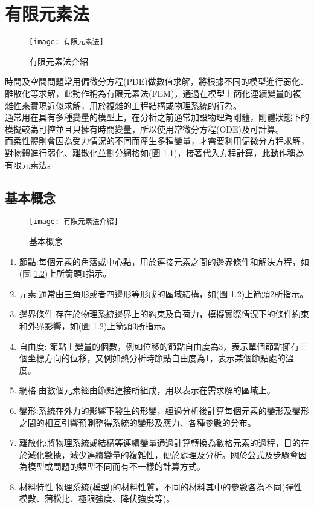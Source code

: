 \chapter{有限元素法}

\begin{figure}[hbt!]
\begin{center}
\texttt{[image: 有限元素法]}
\caption{\Large 有限元素法介紹}\label{有限元素法}
\end{center}
\end{figure}
時間及空間問題常用偏微分方程(PDE)做數值求解，將根據不同的模型進行弱化、離散化等求解，此動作稱為有限元素法(FEM)，通過在模型上簡化連續變量的複雜性來實現近似求解，用於複雜的工程結構或物理系統的行為。\\
通常用在具有多種變量的模型上，在分析之前通常加設物理為剛體，剛體狀態下的模擬較為可控並且只擁有時間變量，所以使用常微分方程(ODE)及可計算。\\
而柔性體則會因為受力情況的不同而產生多種變量，才需要利用偏微分方程求解，對物體進行弱化、離散化並劃分網格如(圖 \ref{有限元素法})，接著代入方程計算，此動作稱為有限元素法。\\
\newpage
\section{基本概念}

\begin{figure}[hbt!]
\begin{center}
\texttt{[image: 有限元素法介紹]}
\caption{\Large 基本概念}\label{有限元素法介紹}
\end{center}
\end{figure}

\begin{enumerate}
\item 節點:每個元素的角落或中心點，用於連接元素之間的邊界條件和解決方程，如(圖 \ref{有限元素法介紹})上所箭頭1指示。
\item 元素:通常由三角形或者四邊形等形成的區域結構，如(圖 \ref{有限元素法介紹})上箭頭2所指示。
\item 邊界條件:存在於物理系統邊界上的約束及負荷力，模擬實際情況下的條件約束和外界影響，如(圖 \ref{有限元素法介紹})上箭頭3所指示。
\item 自由度: 節點上變量的個數，例如位移的節點自由度為3，表示單個節點擁有三個坐標方向的位移，又例如熱分析時節點自由度為1，表示某個節點處的溫度。
\item 網格:由數個元素經由節點連接所組成，用以表示在需求解的區域上。
\item 變形:系統在外力的影響下發生的形變，經過分析後計算每個元素的變形及變形之間的相互引響預測整得系統的變形及應力、各種參數的分布。
\item 離散化:將物理系統或結構等連續變量通過計算轉換為數格元素的過程，目的在於減化數據，減少連續變量的複雜性，便於處理及分析。關於公式及步驟會因為模型或問題的類型不同而有不一樣的計算方式。
\item 材料特性:物理系統(模型)的材料性質，不同的材料其中的參數各為不同(彈性模數、蒲松比、極限強度、降伏強度等)。\\
\end{enumerate}

